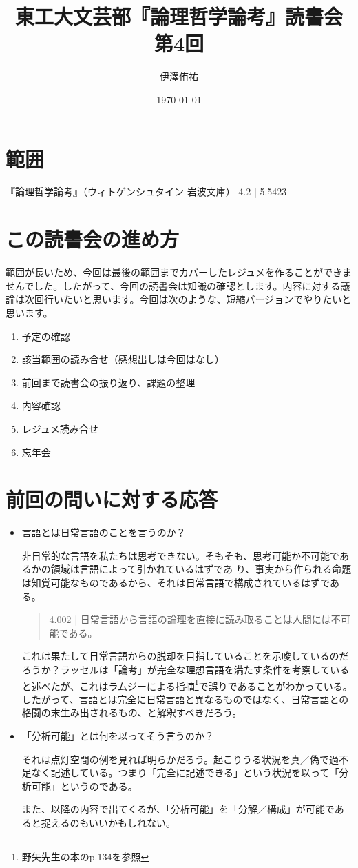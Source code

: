 \documentclass[a4paper,onecolumn,openany,article]{jsarticle}
\title{東工大文芸部『論理哲学論考』読書会 第4回}
\author{伊澤侑祐}
\date{\today}
\begin{document}
\maketitle

\section*{範囲}
『論理哲学論考』（ウィトゲンシュタイン 岩波文庫） 4.2 | 5.5423

\section{この読書会の進め方}
範囲が長いため、今回は最後の範囲までカバーしたレジュメを作ることができませんでした。したがって、今回の読書会は知識の確認とします。内容に対する議論は次回行いたいと思います。今回は次のような、短縮バージョンでやりたいと思います。
\begin{enumerate}
  \item 予定の確認
  \item 該当範囲の読み合せ（感想出しは今回はなし）
  \item 前回まで読書会の振り返り、課題の整理
  \item 内容確認
  \item レジュメ読み合せ
  \item 忘年会
\end{enumerate}

\section{前回の問いに対する応答}
\begin{itemize}
  \item 言語とは日常言語のことを言うのか？
  
  非日常的な言語を私たちは思考できない。そもそも、思考可能か不可能であるかの領域は言語によって引かれているはずであ り、事実から作られる命題は知覚可能なものであるから、それは日常言語で構成されているはずである。
  \begin{quote}
     4.002 | 日常言語から言語の論理を直接に読み取ることは人間には不可能である。
  \end{quote}  
   
  これは果たして日常言語からの脱却を目指していることを示唆しているのだろうか？ラッセルは「論考」が完全な理想言語を満たす条件を考察していると述べたが、これはラムジーによる指摘\footnote{野矢先生の本のp.134を参照}で誤りであることがわかっている。したがって、言語とは完全に日常言語と異なるものではなく、日常言語との格闘の末生み出されるもの、と解釈すべきだろう。
  
  \item 「分析可能」とは何を以ってそう言うのか？
  
  それは点灯空間の例を見れば明らかだろう。起こりうる状況を真／偽で過不足なく記述している。つまり「完全に記述できる」という状況を以って「分析可能」というのである。
  
  また、以降の内容で出てくるが、「分析可能」を「分解／構成」が可能であると捉えるのもいいかもしれない。
  
\end{itemize}
\end{document}
